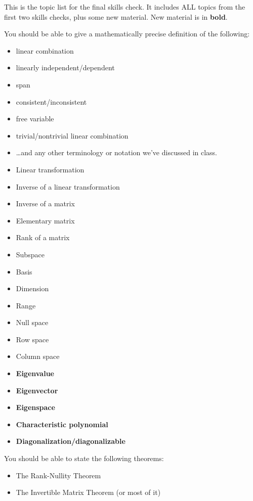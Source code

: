 \documentclass[10pt]{article}
\begin{document}
	
This is the topic list for the final skills check.  It includes ALL topics from the first two skills checks, plus some new material.  New material is in \textbf{bold}.

You should be able to give a mathematically precise definition of the following:

\begin{itemize}
	\item linear combination
	\item linearly independent/dependent
	\item span
	\item consistent/inconsistent
	\item free variable
	\item trivial/nontrivial linear combination
	\item \ldots and any other terminology or notation we've discussed in class.
	\item Linear transformation
	\item Inverse of a linear transformation
	\item Inverse of a matrix
	\item Elementary matrix
	\item Rank of a matrix
	\item Subspace
	\item Basis
	\item Dimension
	\item Range
	\item Null space
	\item Row space
	\item Column space
	\item \textbf{Eigenvalue}
	\item \textbf{Eigenvector}
	\item \textbf{Eigenspace}
	\item \textbf{Characteristic polynomial}
	\item \textbf{Diagonalization/diagonalizable}
\end{itemize}

You should be able to state the following theorems:
\begin{itemize}
	\item The Rank-Nullity Theorem
	\item The Invertible Matrix Theorem (or most of it)
\end{itemize}
\end{document}

